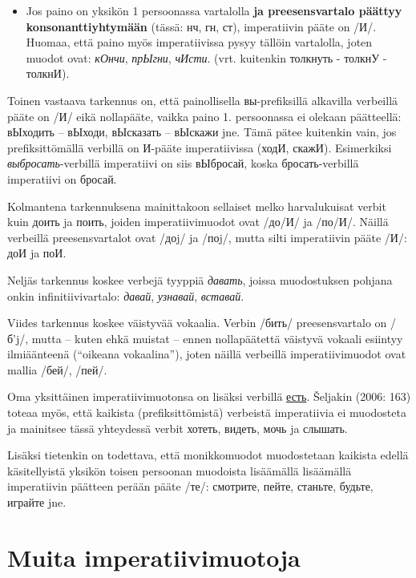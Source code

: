 \documentclass[]{scrreprt}
\providecommand{\tightlist}{%
  \setlength{\itemsep}{0pt}\setlength{\parskip}{0pt}}
\begin{document}
\begin{itemize}
\tightlist
\item
  Jos paino on yksikön 1 persoonassa vartalolla \textbf{ja
  preesensvartalo päättyy konsonanttiyhtymään} (tässä: нч, гн, ст),
  imperatiivin pääte on /И/. Huomaa, että paino myös imperatiivissa
  pysyy tällöin vartalolla, joten muodot ovat: \emph{кОнчи},
  \emph{прЫгни}, \emph{чИсти}. (vrt. kuitenkin толкнуть - толкнУ -
  толкнИ).
\end{itemize}

Toinen vastaava tarkennus on, että painollisella вы-prefiksillä
alkavilla verbeillä pääte on /И/ eikä nollapääte, vaikka paino 1.
persoonassa ei olekaan päätteellä: вЫходить -- вЫходи, вЫсказать --
вЫскажи jne. Tämä pätee kuitenkin vain, jos prefiksittömällä verbillä on
И-pääte imperatiivissa (ходИ, скажИ). Esimerkiksi
\emph{выбросать}-verbillä imperatiivi on siis вЫбросай, koska
бросать-verbillä imperatiivi on бросай.

Kolmantena tarkennuksena mainittakoon sellaiset melko harvalukuisat
verbit kuin доить ja поить, joiden imperatiivimuodot ovat /до/И/ ja
/по/И/. Näillä verbeillä preesensvartalot ovat /доj/ ja /поj/, mutta
silti imperatiivin pääte /И/: доИ ja поИ.

Neljäs tarkennus koskee verbejä tyyppiä \emph{давать}, joissa
muodostuksen pohjana onkin infinitiivivartalo: \emph{давай},
\emph{узнавай}, \emph{вставай}.

Viides tarkennus koskee väistyvää vokaalia. Verbin /бить/
preesensvartalo on /б'j/, mutta -- kuten ehkä muistat -- ennen
nollapäätettä väistyvä vokaali esiintyy ilmiäänteenä (``oikeana
vokaalina''), joten näillä verbeillä imperatiivimuodot ovat mallia
/бей/, /пей/.

Oma yksittäinen imperatiivimuotonsa on lisäksi verbillä
\href{http://ru.wiktionary.org/wiki/\%D0\%B5\%D1\%81\%D1\%82\%D1\%8C}{есть}.
Šeljakin (2006: 163) toteaa myös, että kaikista (prefiksittömistä)
verbeistä imperatiivia ei muodosteta ja mainitsee tässä yhteydessä
verbit хотеть, видеть, мочь ja слышать.

Lisäksi tietenkin on todettava, että monikkomuodot muodostetaan kaikista
edellä käsitellyistä yksikön toisen persoonan muodoista lisäämällä
lisäämällä imperatiivin päätteen perään pääte /те/: смотрите, пейте,
станьте, будьте, играйте jne.

\section{Muita imperatiivimuotoja}\label{muita-imperatiivimuotoja}
\end{document}
